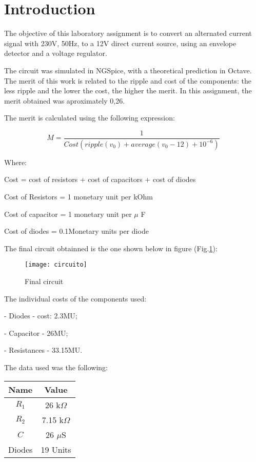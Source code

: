 \section{Introduction}
\label{sec:introduction}

The objective of this laboratory assignment is to convert an alternated current signal with 230V, 50Hz, to a 12V direct current source, using an envelope detector and a voltage regulator.\par
The circuit was simulated in NGSpice, with a theoretical prediction in Octave. The merit of this work is related to the ripple and cost of the components: the less ripple and the lower the cost, the higher the merit. In this assignment, the merit obtained was aproximately 0,26. 

The merit is calculated using the following expression:\par
\begin{equation}
    M = \frac{1}{Cost(ripple(v_0)+average(v_0-12)+10^{-6})}
\end{equation}\par
Where: \par
Cost = cost of resistors + cost of capacitors + cost of diodes \par
Cost of Resistors = 1 monetary unit per kOhm \par
Cost of capacitor = 1 monetary unit per $\mu$ F \par
Cost of diodes = 0.1Monetary units per diode \par
The final circuit obtainned is the one shown below in figure (Fig.\ref{fig:circuito}): \par

\begin{figure}[H]
\centering
\texttt{[image: circuito]}
\caption{Final circuit}
\label{fig:circuito}
\end{figure}

The individual costs of the components used: \par
- Diodes - cost: 2.3MU; \par
- Capacitor - 26MU; \par
- Resistances - 33.15MU. \par

The data used was the following:

\begin{center}
  \begin{tabular}{ | c | c | }
    \hline    
    {\bf Name} & {\bf Value} \\ \hline
    $R_1$ & 26 k$\Omega$ \\ \hline 
    $R_2$ & 7.15 k$\Omega$ \\ \hline 
    $C$ & 26 $\mu$S \\ \hline
    Diodes & 19 Units \\ 
    \hline
  \end{tabular}
\end{center}